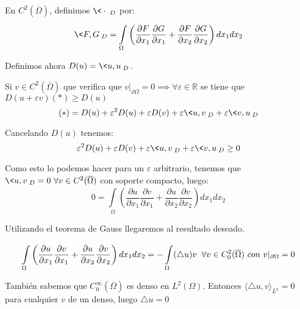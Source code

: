 \documentclass[openany]{book}
\begin{document}
\begin{demonstration}
    
    En $ C^2(\overline{\Omega}) $, definimos $ \<\cdot \>_{D} $ por:
    $$ \<F,G\>_{D} = \int\limits_{\Omega}^{} \left( \dfrac{\partial F}{\partial x_1} \dfrac{\partial G}{\partial x_1} + \dfrac{\partial F}{\partial x_2} \dfrac{\partial G}{\partial x_2} \right) dx_1dx_2$$

    Definimos ahora $ D(u) = \<u,u\>_{D} $.

    Si $ v \in C^2(\overline{\Omega}) $ que verifica que $ v|_{\partial \Omega} = 0 \implies \forall  \varepsilon \in \mathbb{R} $ se tiene que $ D(u+ \varepsilon v) (*)\geq  D(u) $
    $$ (*) = D(u)+ \varepsilon^2 D(u) + \varepsilon D(v) + \varepsilon \<u,v\>_{D}+ \varepsilon \<v,u\>_{D} $$

    Cancelando $ D(u) $ tenemos:
    $$ \varepsilon^2 D(u) + \varepsilon D(v) + \varepsilon \<u,v\>_{D}+ \varepsilon \<v,u\>_{D}\geq  0 $$

    Como esto lo podemos hacer para un $ \varepsilon $ arbitrario, tenemos que $ \<u,v\>_{D} = 0\ \forall v \in C^2(\overline{\Omega }) $ con soporte compacto, luego:
    $$ 0 = \int\limits_{\Omega}^{} \left( \dfrac{\partial u}{\partial x_1} \dfrac{\partial v}{\partial x_1}+ \dfrac{\partial u}{\partial x_2} \dfrac{\partial v}{\partial x_2} \right) dx_1 dx_2 $$

    Utilizando el teorema de Gauss llegaremos al resultado deseado.

    $$ \int\limits_{\Omega}^{} \left( \dfrac{\partial u}{\partial x_1} \dfrac{\partial v}{\partial x_1}+ \dfrac{\partial u}{\partial x_2} \dfrac{\partial v}{\partial x_2} \right) dx_1 dx_2 = - \int\limits_{\Omega }^{} (\triangle u)v \hspace{2mm} \forall  v \in C_0^2(\overline{\Omega })\ con\ v|_{\partial \Omega } = 0 $$

    También sabemos que $ C_0^{\infty}(\overline{\Omega }) $ es denso en $ L^2(\Omega ) $. Entonces $ \langle \triangle u, v \rangle_{L^2} = 0 $ para cualquier $ v $ de un denso, luego $ \triangle u = 0 $


\end{demonstration}




\end{document}
